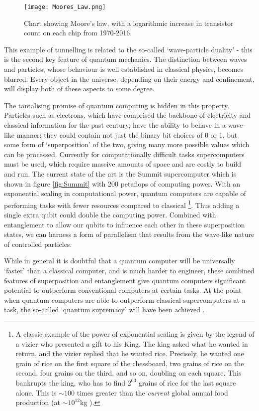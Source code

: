 \begin{figure}[!ht]
	\centering
	\texttt{[image: Moores\_Law.png]}
	\caption{Chart showing Moore's law, with a logarithmic increase in transistor 	count on each chip from 1970-2016.}
	\label{fig:Moore's_Law}
\end{figure}

This example of tunnelling is related to the so-called `wave-particle duality' - this is the second key feature of quantum mechanics. The distinction between waves and particles, whose behaviour is well established in classical physics, becomes blurred. Every object in the universe, depending on their energy and confinement, will display both of these aspects to some degree. 

The tantalising promise of quantum computing is hidden in this property. Particles such as electrons, which have comprised the backbone of electricity and classical information for the past century, have the ability to behave in a wave-like manner: they could contain not just the binary bit choices of 0 or 1, but some form of `superposition' of the two, giving many more possible values which can be processed. Currently for computationally difficult tasks supercomputers must be used, which require massive amounts of space and are costly to build and run. The current state of the art is the Summit supercomputer which is shown in figure  \autoref{fig:Summit} with 200 petaflops of computing power. With an exponential scaling in computational power, quantum computers are capable of performing tasks with fewer resources compared to classical \footnote{A classic example of the power of exponential scaling is given by the legend of a vizier who presented a gift to his King. The king asked what he wanted in return, and the vizier replied that he wanted rice. Precisely, he wanted one grain of rice on the first square of the chessboard, two grains of rice on the second, four grains on the third, and so on, doubling on each square. This bankrupts the king, who has to find $2^{63}$ grains of rice for the last square alone. This is $\sim 100$ times greater than the \emph{current} global annual food production (at $\sim 10^{12}$kg \cite{Globalfoodproduction}).}. Thus adding a single extra qubit could double the computing power. Combined with entanglement to allow our qubits to influence each other in these superposition states, we can harness a form of parallelism that results from the wave-like nature of controlled particles. 

While in general it is doubtful that a quantum computer will be universally  `faster' than a classical computer, and is much harder to engineer, these combined features of superposition and entanglement give quantum computers significant potential to outperform conventional computers at certain tasks. At the point when quantum computers are able to outperform classical supercomputers at a task, the so-called `quantum supremacy' will have been achieved \cite{Preskill2012}. 


